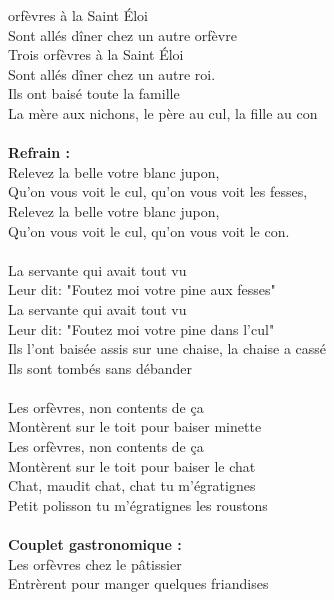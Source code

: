 \vspace{-0.3cm}
 orfèvres à la Saint \'Eloi
\\Sont allés dîner chez un autre orfèvre
\\Trois orfèvres à la Saint \'Eloi
\\Sont allés dîner chez un autre roi.
\\Ils ont baisé toute la famille
\\La mère aux nichons, le père au cul, la fille au con
\\\\\textbf{Refrain :}
\\Relevez la belle votre blanc jupon,
\\Qu'on vous voit le cul, qu'on vous voit les fesses,
\\Relevez la belle votre blanc jupon,
\\Qu'on vous voit le cul, qu'on vous voit le con.
\\\\La servante qui avait tout vu
\\Leur dit: "Foutez moi votre pine aux fesses"
\\La servante qui avait tout vu
\\Leur dit: "Foutez moi votre pine dans l'cul"
\\Ils l'ont baisée assis sur une chaise, la chaise a cassé
\\Ils sont tombés sans débander
\\\\Les orfèvres, non contents de ça
\\Montèrent sur le toit pour baiser minette
\\Les orfèvres, non contents de ça
\\Montèrent sur le toit pour baiser le chat
\\Chat, maudit chat, chat tu m'égratignes
\\Petit polisson tu m'égratignes les roustons
\\\\\textbf{Couplet gastronomique :}
\\Les orfèvres chez le pâtissier
\\Entrèrent pour manger quelques friandises
